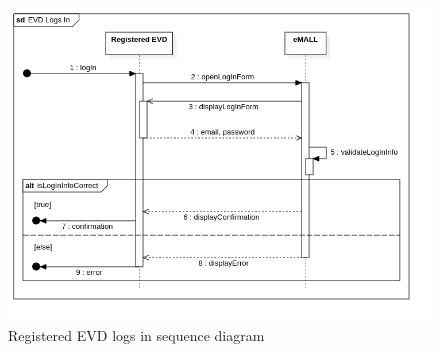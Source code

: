 \begin{center}
    \begin{figure} [H]
        \begin{center}
            \includegraphics[width=0.9\linewidth]{Images/SequenceDiagrams/evd_logs_in}
            \caption{Registered EVD logs in sequence diagram}
            \label{fig: evd_logs_in_seq_diag}
        \end{center}
    \end{figure}
\end{center}

\newpage

